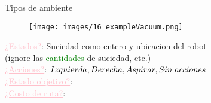
    \begin{frame}{Tipos de ambiente}
        \begin{figure}\texttt{[image: images/16\_exampleVacuum.png]}\end{figure}
        \small{
            \textcolor{Pink}{\underline{¿Estados?}}: Suciedad como entero y ubicacion del robot \\          \hspace{1.8cm} (ignore las \textcolor{Green}{cantidades} de suciedad, etc.) \\
            \textcolor{Pink}{\underline{¿Acciones?}}: \textcolor{Purple}{$Izquierda, Derecha, Aspirar, %
            Sin \hspace{0.1cm}acciones$} \\
            \textcolor{Pink}{\underline{¿Estado objetivo?}}: \\
            \textcolor{Pink}{\underline{¿Costo de ruta?}}: 
        }
        \break\break\break\break\break
    \end{frame}
